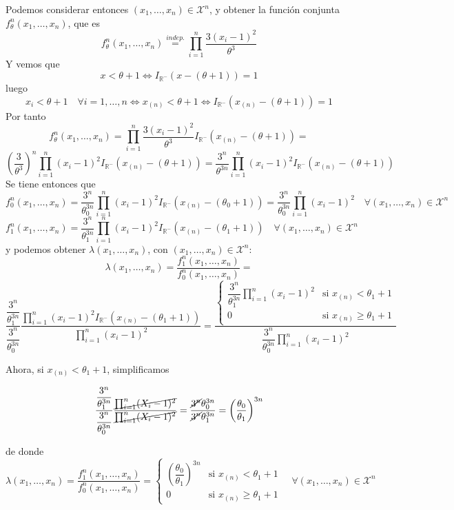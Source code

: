 \documentclass[12pt]{article}
\newcommand{\R}{\mathbb{R}}
\newcommand{\X}{\mathcal{X}}
\newcommand{\Rmenos}{\R^{-}}
\begin{document}
\begin{ejercicio}[2 puntos]
        Podemos considerar entonces $(x_1, \ldots, x_n) \in \X^n$, y obtener la función conjunta $f_\theta^n(x_1, \ldots, x_n)$, que es 
        $$f_\theta^n(x_1, \ldots, x_n) \stackrel{indep.}{=} \prod_{i=1}^n \frac{3{(x_i-1)}^{2}}{\theta^3}$$ 
        Y vemos que $$x<\theta+1 \iff I_{\Rmenos}(x - (\theta + 1)) = 1$$
        luego $$x_i < \theta + 1 \quad \forall i = 1, \ldots, n \iff x_{(n)} < \theta + 1 \iff I_{\Rmenos}(x_{(n)} - (\theta + 1)) = 1$$
        Por tanto $$f_\theta^n(x_1, \ldots, x_n) = \prod_{i=1}^n \frac{3{(x_i-1)}^{2}}{\theta^3} I_{\Rmenos}(x_{(n)} - (\theta + 1)) = $$
        $$\left(\dfrac{3}{\theta^3} \right)^n \prod_{i=1}^n (x_i-1)^2 I_{\Rmenos}(x_{(n)} - (\theta + 1)) =
        \dfrac{3^n}{\theta^{3n}} \prod_{i=1}^n (x_i-1)^2 I_{\Rmenos}(x_{(n)} - (\theta + 1))$$
        Se tiene entonces que
        $$f_0^n(x_1, \ldots, x_n) = \dfrac{3^n}{\theta_0^{3n}} \prod_{i=1}^n (x_i-1)^2 I_{\Rmenos}(x_{(n)} - (\theta_0 + 1)) = \dfrac{3^n}{\theta_0^{3n}} \prod_{i=1}^n (x_i-1)^2 \quad \forall (x_1, \ldots, x_n) \in \X^n$$
        $$f_1^n(x_1, \ldots, x_n) = \dfrac{3^n}{\theta_1^{3n}} \prod_{i=1}^n (x_i-1)^2 I_{\Rmenos}(x_{(n)} - (\theta_1 + 1)) \quad \forall (x_1, \ldots, x_n) \in \X^n$$
        y podemos obtener $\lambda(x_1, \ldots, x_n)$, con $(x_1, \ldots, x_n) \in \X^n$: 
        $$\lambda(x_1, \ldots, x_n) = \dfrac{f_1^n(x_1, \ldots, x_n)}{f_0^n(x_1, \ldots, x_n)} = $$$$
        \dfrac{\dfrac{3^n}{\theta_1^{3n}}}{\dfrac{3^n}{\theta_0^{3n}}} \dfrac{\displaystyle\prod_{i=1}^n (x_i-1)^2 I_{\Rmenos}(x_{(n)} - (\theta_1 + 1))}
        {\displaystyle\prod_{i=1}^n (x_i-1)^2} = 
        \dfrac{\begin{cases} \dfrac{3^n}{\theta_1^{3n}} \displaystyle\prod_{i=1}^n (x_i-1)^2 &\text{si } x_{(n)} < \theta_1 + 1 \\ 0 &\text{si } x_{(n)} \geq \theta_1 + 1 \end{cases}}
        {\dfrac{3^n}{\theta_0^{3n}} \displaystyle\prod_{i=1}^n (x_i-1)^2}$$

        Ahora, si $x_{(n)} < \theta_1 + 1$, simplificamos

        $$\dfrac{\dfrac{3^n}{\theta_1^{3n}}}{\dfrac{3^n}{\theta_0^{3n}}} \dfrac{\cancel{\prod_{i=1}^n (X_i-1)^2}}
        {\cancel{\prod_{i=1}^n (X_i-1)^2}} = \dfrac{\cancel{3^n} \theta_0^{3n}}{\cancel{3^n} \theta_1^{3n}} = \left( \dfrac{\theta_0}{\theta_1} \right)^{3n}$$

        de donde
        $$\lambda(x_1, \ldots, x_n) = \dfrac{f_1^n(x_1, \ldots, x_n)}{f_0^n(x_1, \ldots, x_n)} = 
        \begin{cases} 
            \left( \dfrac{\theta_0}{\theta_1} \right)^{3n} &\text{si } x_{(n)} < \theta_1 + 1 \\ 
            0 &\text{si } x_{(n)} \geq \theta_1 + 1 
        \end{cases} \quad \forall (x_1, \ldots, x_n) \in \X^n$$


\end{ejercicio}
\end{document}
